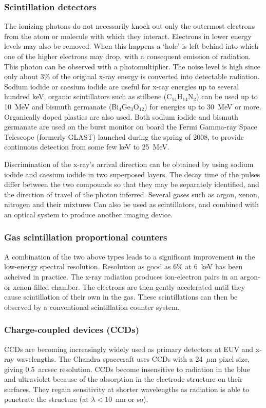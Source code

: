 \subsubsection{Scintillation detectors}
The ionizing photons do not necessarily knock 
out only the outermost electrons from the atom or molecule with which they 
interact. Electrons in lower energy levels may also be removed. When this 
happens a `hole' is left behind into which one of the higher electrons may
drop, with a consequent emission of radiation. This photon can be observed
with a photomultiplier. 
The noise level is high since only about 3\% of the original x-ray energy
is converted into detectable radiation. Sodium iodide or caesium iodide are 
useful for x-ray energies up to several hundred keV, organic scintillators
such as stilbene (C$_{14}$H$_{14}$N$_2$) can be used up to 10~MeV and bismuth
germanate (Bi$_4$Ge$_3$O$_{12}$) for energies up to 30~MeV or more. Organically
doped plastics are also used. Both sodium iodide and bismuth germanate are used
on the burst monitor on board the Fermi Gamma-ray Space Telescope (formerly
GLAST) launched during the spring of 2008, to provide continuous detection
from some few keV to 25~MeV. 

Discrimination of the x-ray's arrival direction can be obtained by using 
sodium iodide and caesium iodide in two superposed layers. The decay time
of the pulses differ between the two compounds so that they may be 
separately identified, and the direction of travel of the photon inferred.
Several gases such as argon, xenon, nitrogen and their mixtures Can also
be used as scintillators, and combined with an optical system to produce
another imaging device.

\subsubsection{Gas scintillation proportional counters}
A combination of the two
above types leads to a significant improvement in the low-energy spectral
resolution. Resolution as good as 6\% at 6~keV has been acheived in practice.
The x-ray radiation produces ion-electron pairs in an argon- or xenon-filled
chamber. The electrons are then gently accelerated until they cause 
scintillation of their own in the gas. These scintillations can then be
observed by a conventional scintillation counter system. 

\subsubsection{Charge-coupled devices (CCDs)}
CCDs are becoming increasingly widely used as 
primary detectors at EUV and x-ray wavelengths. The Chandra spacecraft 
uses CCDs with a 24~$\mu$m pixel size, giving 0.5~arcsec resolution. CCDs
become insensitive to radiation in the blue and ultraviolet because of the 
absorption in the electrode structure on their surfaces. They regain sensitivity at
shorter wavelengths as radiation is able to penetrate the structure
 (at $\lambda<10$~nm or so).

